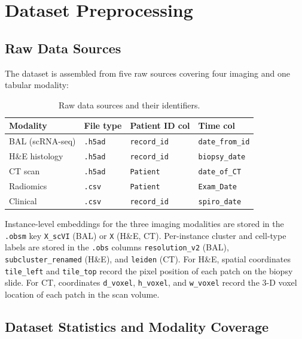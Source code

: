 \documentclass[11pt,a4paper]{article}
\begin{document}
\section{Dataset Preprocessing}

\subsection{Raw Data Sources}

The dataset is assembled from five raw sources covering four imaging and one
tabular modality:

\begin{table}[h]
\centering
\caption{Raw data sources and their identifiers.}
\label{tab:datasources}
\begin{tabular}{llll}
\toprule
Modality & File type & Patient ID col & Time col \\
\midrule
BAL (scRNA-seq) & \texttt{.h5ad} & \texttt{record\_id} & \texttt{date\_from\_id} \\
H\&E histology  & \texttt{.h5ad} & \texttt{record\_id} & \texttt{biopsy\_date} \\
CT scan         & \texttt{.h5ad} & \texttt{Patient}    & \texttt{date\_of\_CT} \\
Radiomics       & \texttt{.csv}  & \texttt{Patient}    & \texttt{Exam\_Date} \\
Clinical        & \texttt{.csv}  & \texttt{record\_id} & \texttt{spiro\_date} \\
\bottomrule
\end{tabular}
\end{table}

\noindent
Instance-level embeddings for the three imaging modalities are stored in the
\texttt{.obsm} key \texttt{X\_scVI} (BAL) or \texttt{X} (H\&E, CT).
Per-instance cluster and cell-type labels are stored in the \texttt{.obs}
columns \texttt{resolution\_v2} (BAL), \texttt{subcluster\_renamed} (H\&E),
and \texttt{leiden} (CT).
For H\&E, spatial coordinates \texttt{tile\_left} and \texttt{tile\_top}
record the pixel position of each patch on the biopsy slide.
For CT, coordinates \texttt{d\_voxel}, \texttt{h\_voxel}, and
\texttt{w\_voxel} record the 3-D voxel location of each patch in the scan
volume.

\subsection{Dataset Statistics and Modality Coverage}
\end{document}
